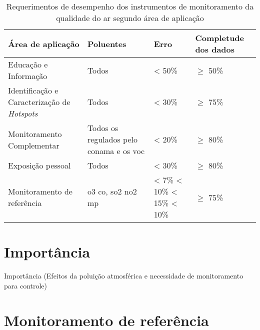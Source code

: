 \begin{table}[t]
    \caption{Requerimentos de desempenho dos instrumentos de monitoramento da qualidade do ar segundo área de aplicação}
    \begin{tabular}{ 
    | m{} m{} m{} m{} | }
        \hline
        Área de aplicação & Poluentes & Erro & Completude dos dados \\ [0.5ex] 
        \hline
        Educação e Informação & Todos & < 50\% & $\geq$ 50\% \\ [0.5ex]
        \hline
        Identificação e Caracterização de \textit{Hotspots}\footnotemark & Todos & < 30\% & $\geq$ 75\% \\ [0.5ex]
        \hline
        Monitoramento Complementar & Todos os regulados pelo \gls{conama} e os \acrshort{voc} & < 20\% & $\geq$ 80\% \\ [0.5ex]
        \hline
        Exposição pessoal & Todos & < 30\% & $\geq$ 80\% \\ [0.5ex]
        \hline
        Monitoramento de referência & \acrshort{o3} \newline \acrshort{co}, \acrshort{so2} \newline \acrshort{no2} \newline \acrshort{mp} & < 7\% \newline < 10\% \newline < 15\% \newline < 10\% & $\geq$ 75\% \\ [0.5ex]
        \hline
    \end{tabular}
    \label{tab:monitoring-areas-EPA}
\end{table}

\section{Importância}

Importância (Efeitos da poluição atmosférica e necessidade de monitoramento para controle)

\section{Monitoramento de referência}

